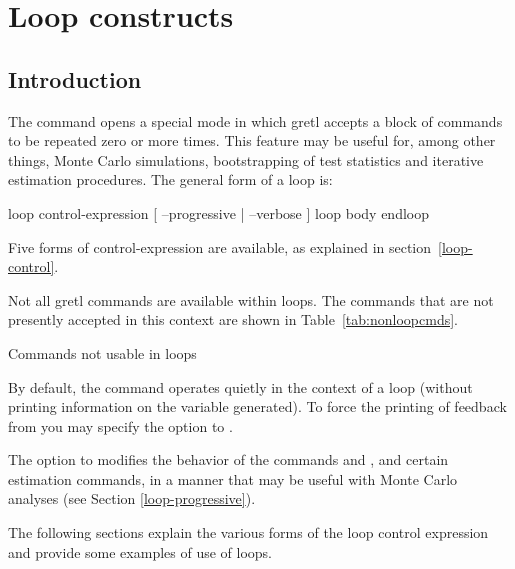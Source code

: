 \chapter{Loop constructs}
\label{chap:looping}

\section{Introduction}
\label{loop-intro}

The command  opens a special mode in which gretl
accepts a block of commands to be repeated zero or more times.  This
feature may be useful for, among other things, Monte Carlo simulations,
bootstrapping of test statistics and iterative estimation procedures.
The general form of a loop is:

\begin{code}
loop control-expression [ --progressive | --verbose ]
   loop body
endloop
\end{code}

Five forms of control-expression are available, as explained in
section~\ref{loop-control}.

Not all gretl commands are available within loops.  The commands
that are not presently accepted in this context are shown in
Table~\ref{tab:nonloopcmds}.

\begin{table}[htbp]
\caption{Commands not usable in loops}
\label{tab:nonloopcmds}
\begin{center}

\end{center}
\end{table}

By default, the  command operates quietly in the context of
a loop (without printing information on the variable generated).  To
force the printing of feedback from  you may specify the
 option to .

The  option to  modifies the behavior of
the commands  and , and certain estimation
commands, in a manner that may be useful with Monte Carlo analyses
(see Section \ref{loop-progressive}).
    
The following sections explain the various forms of the loop control
expression and provide some examples of use of loops.  


